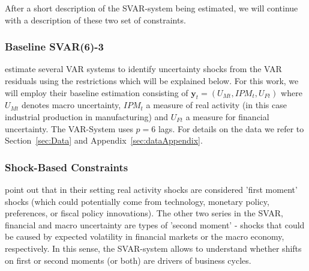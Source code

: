 \documentclass[a4paper,11pt,listof=nochaptergap,oneside,pointednumbers,bibtotoc,bigheadings,liststotoc,hidelinks]{scrbook}
\theoremstyle{mysatz}
\theoremstyle{mydefinition}
\theoremstyle{mytheorem}
\theoremstyle{mybemerkung}
\newcommand{\vect}[1]{\boldsymbol{\mathbf{#1}}}
\begin{document}
After a short description of the SVAR-system being estimated, we will continue with a description of these two set of constraints.

\subsubsection{Baseline SVAR(6)-3}
\citet{ludvigsonetal:18,ludvigsonetal:19} estimate several VAR systems to identify uncertainty shocks from the VAR residuals using the restrictions which will be explained below. For this work, we will employ their baseline estimation consisting of $\vect{y}_t = (U_{Mt}, IPM_{t}, U_{Ft})$ where $U_{Mt}$ denotes macro uncertainty, $IPM_{t}$ a measure of real activity (in this case industrial production in manufacturing) and $U_{Ft}$ a measure for financial uncertainty. The VAR-System uses $p=6$ lags. For details on the data we refer to Section~\ref{sec:Data} and Appendix~\ref{sec:dataAppendix}.

\subsubsection{Shock-Based Constraints}
\citet{ludvigsonetal:18,ludvigsonetal:19} point out that in their setting real activity shocks are considered 'first moment' shocks (which could potentially come from technology, monetary policy, preferences, or fiscal policy innovations). The other two series in the SVAR, financial and macro uncertainty are types of 'second moment' - shocks that could be caused by expected volatility in financial markets or the macro economy, respectively. In this sense, the SVAR-system allows to understand whether shifts on first or second moments (or both) are drivers of business cycles.
\end{document}
